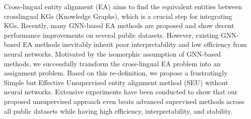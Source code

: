 Cross-lingual entity alignment (EA) aims to find the equivalent entities between crosslingual KGs (Knowledge Graphs), which is a crucial step for integrating KGs. Recently, many GNN-based EA methods are proposed and show decent performance improvements on several public datasets. However, existing GNN-based EA methods inevitably inherit poor interpretability and low efficiency from neural networks. Motivated by the isomorphic assumption of GNN-based methods, we successfully transform the cross-lingual EA problem into an assignment problem. Based on this re-definition, we propose a frustratingly Simple but Effective Unsupervised entity alignment method (SEU) without neural networks. Extensive experiments have been conducted to show that our proposed unsupervised approach even beats advanced supervised methods across all public datasets while having high efficiency, interpretability, and stability.
